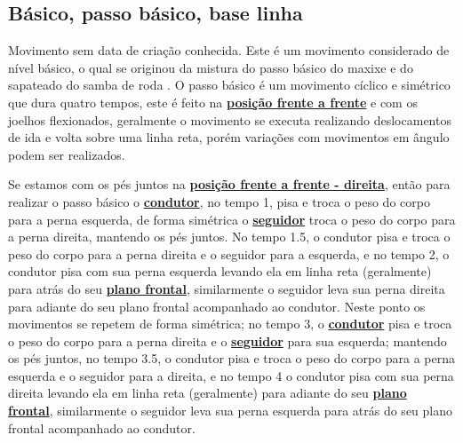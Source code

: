  
\subsection{Básico, passo básico, base linha}
\label{subsec:passobasico}

Movimento sem data de criação conhecida.
Este é um movimento considerado de nível básico, o qual se originou da mistura do 
passo básico do maxixe e do sapateado do samba de roda \cite[pp. 144, 146]{perna2002samba}.
O passo básico é um movimento cíclico e simétrico que dura quatro tempos, 
este é feito na \hyperref[def:frente-frente-position]{\textbf{posição frente a frente}}
e com os joelhos flexionados, geralmente o movimento se executa realizando deslocamentos de ida e volta sobre uma linha reta, 
porém variações com movimentos em ângulo podem ser realizados.

Se estamos com os pés juntos na \hyperref[def:ffd-position]{\textbf{posição frente a frente - direita}}, então
para realizar o passo básico 
o \hyperref[def:Condutor]{\textbf{condutor}}, no tempo 1, pisa e troca o peso do corpo 
para a perna esquerda, de forma simétrica o \hyperref[def:Seguidor]{\textbf{seguidor}} troca o peso do corpo para a perna direita, 
mantendo os pés juntos.
No tempo 1.5, o condutor pisa e troca o peso do corpo para a perna direita e o seguidor para a esquerda,
e no tempo 2, o condutor pisa com sua perna esquerda levando ela em linha reta (geralmente) para atrás do seu 
\hyperref[def:PlanoFrontal]{\textbf{plano frontal}}, 
similarmente o seguidor leva sua perna direita para adiante do seu plano frontal
acompanhado ao condutor.
Neste ponto os movimentos se repetem de forma simétrica; 
no tempo 3, o \hyperref[def:Condutor]{\textbf{condutor}} pisa e troca o peso do corpo 
para a perna direita e o \hyperref[def:Seguidor]{\textbf{seguidor}} para sua esquerda; 
mantendo os pés juntos, 
no tempo 3.5, o condutor pisa e troca o peso do corpo para a perna esquerda e o seguidor para a direita,
e no tempo 4 o condutor pisa com sua perna direita levando ela em linha reta (geralmente) para adiante do seu 
\hyperref[def:PlanoFrontal]{\textbf{plano frontal}}, 
similarmente o seguidor leva sua perna esquerda para atrás do seu plano frontal
acompanhado ao condutor.

